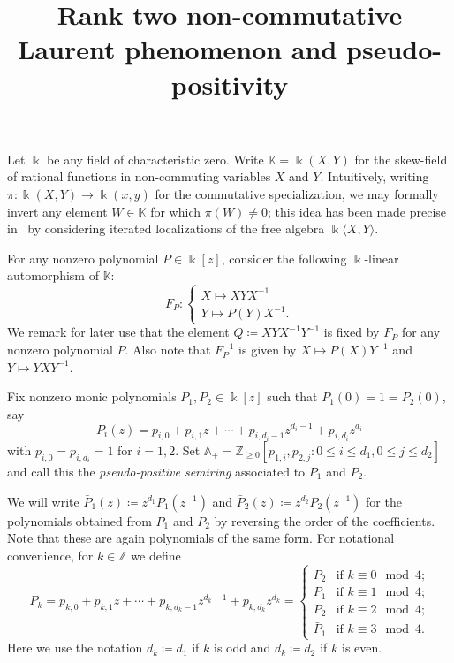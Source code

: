 \documentclass[ALCO,ThmDefs,Unicode,epreuves]{cedram}
\author{\firstname{Dylan} \middlename{C.} \lastname{Rupel}}
\title[Rank two non-commutative Laurent phenomenon and pseudo-positivity]
{Rank two non-commutative Laurent phenomenon and pseudo-positivity}
\newcommand{\kk}{\Bbbk}
\renewcommand{\AA}{\mathbb{A}}
\newcommand{\KK}{\mathbb{K}}
\newcommand{\ZZ}{\mathbb{Z}}
\begin{document}


\maketitle

 \setcounter{section}{1}

 \noindent
 Let $\kk$ be any field of characteristic zero. Write $\KK=\kk(X,Y)$ for the skew-field of rational functions in non-commuting variables $X$ and $Y$. Intuitively, writing $\pi:\kk(X,Y)\to\kk(x,y)$ for the commutative specialization, we may formally invert any element $W\in\KK$ for which $\pi(W)\ne0$; this idea has been made precise in~\cite{usnich1} by considering iterated localizations of the free algebra $\kk\langle X,Y\rangle$.

 For any nonzero polynomial $P\in\kk[z]$, consider the following $\kk$-linear automorphism of $\KK$:
 \[F_P:\begin{cases} X\mapsto XYX^{-1}\\ Y\mapsto P(Y)X^{-1}.\end{cases}\]
 We remark for later use that the element $Q\coloneqq XYX^{-1}Y^{-1}$ is fixed by $F_P$ for any nonzero polynomial $P$.
 Also note that $F_P^{-1}$ is given by $X\mapsto P(X)Y^{-1}$ and $Y\mapsto YXY^{-1}$.

 Fix nonzero monic polynomials $P_1,P_2\in\kk[z]$ such that $P_1(0)=1=P_2(0)$, say
 \[P_i(z)=p_{i,0}+p_{i,1}z+\cdots+p_{i,d_i-1}z^{d_i-1}+p_{i,d_i}z^{d_i}\]
 with $p_{i,0}=p_{i,d_i}=1$ for $i=1,2$. Set $\AA_+=\ZZ_{\ge0}[p_{1,i},p_{2,j}:0\le i\le d_1,0\le j\le d_2]$ and call this the \emph{pseudo-positive semiring} associated to $P_1$ and $P_2$. 

 We will write $\bar{P}_1(z)\coloneqq z^{d_1}P_1(z^{-1})$ and $\bar{P}_2(z)\coloneqq z^{d_2}P_2(z^{-1})$ for the polynomials obtained from $P_1$ and $P_2$ by reversing the order of the coefficients. Note that these are again polynomials of the same form. For notational convenience, for $k\in\ZZ$ we define 
 \begin{equation}
 \label{eq:reversed polynomials}
 P_k=p_{k,0}+p_{k,1}z+\cdots+p_{k,d_k-1}z^{d_k-1}+p_{k,d_k}z^{d_k}=\begin{cases}\bar{P}_2 & \text{if $k\equiv 0\mod 4$;}\\P_1 & \text{if $k\equiv 1\mod 4$;}\\P_2 & \text{if $k\equiv 2\mod 4$;}\\\bar{P}_1 & \text{if $k\equiv 3\mod 4$.}\end{cases}
 \end{equation}
 Here we use the notation $d_k\coloneqq d_1$ if $k$ is odd and $d_k\coloneqq d_2$ if $k$ is even.
\end{document}
